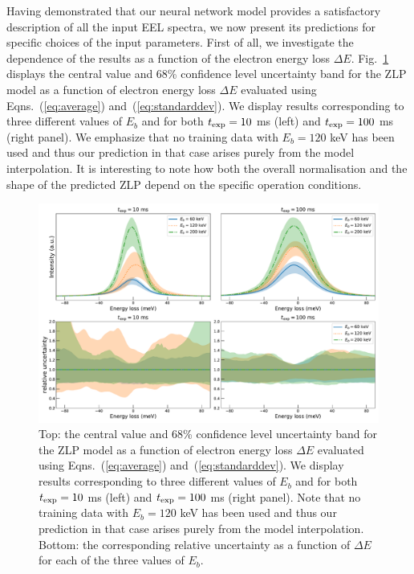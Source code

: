 Having demonstrated that our neural network model provides a satisfactory description
of all the input EEL spectra, we now present its  predictions for specific
choices of the input parameters.
%
First of all, we investigate the dependence of the results as a function of the
electron energy loss $\Delta E$.
%
Fig.~\ref{fig:EELS_vacuum_DeltaE} displays the central value and 68\% confidence level uncertainty band
for the ZLP model as a function
of electron energy loss $\Delta E$
evaluated using Eqns.~(\ref{eq:average}) and~(\ref{eq:standarddev}).
%
We display results corresponding to 
three different values of $E_b$  and for both
$t_{\rm exp}=10$ ms (left)  and $t_{\rm exp}=100$ ms (right panel).
%
We emphasize that no training data with $E_b=120$ keV has been used and thus our prediction
in that case arises purely from the model interpolation.
%
It is interesting to note how both the overall normalisation and the shape of
the predicted ZLP depend on the specific operation conditions.

\begin{figure}[t]
    \centering
    \includegraphics[width=170mm]{plots/deltaE_dependence_vacuum.pdf}
    \caption{\small Top: the central value and 68\% confidence level uncertainty band
      for the ZLP model as a function
      of electron energy loss $\Delta E$
      evaluated using Eqns.~(\ref{eq:average}) and~(\ref{eq:standarddev}).
      We display results corresponding to 
      three different values of $E_b$  and for both
      $t_{\rm exp}=10$ ms (left)  and $t_{\rm exp}=100$ ms (right panel).
      Note that no training data with $E_b=120$ keV has been used and thus our prediction
      in that case arises purely from the model interpolation.
      Bottom: the corresponding relative uncertainty as a function of $\Delta E$
      for each of the three values of $E_b$.
      \label{fig:EELS_vacuum_DeltaE}}
\end{figure}

